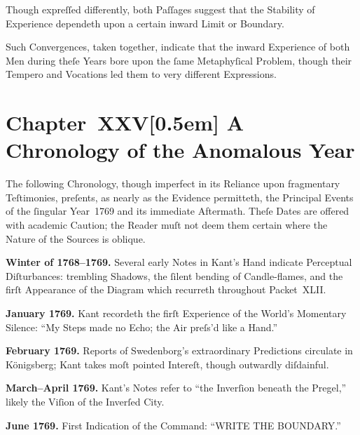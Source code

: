 \documentclass[12pt]{book}
\begin{document}
Though expreſſed differently, both Paſſages suggest that the Stability of Experience dependeth upon a certain inward Limit or Boundary.

\medskip

\noindent Such Convergences, taken together, indicate that the inward Experience of both Men during theſe Years bore upon the ſame Metaphyſical Problem, though their Tempero and Vocations led them to very different Expressions.


\chapter*{Chapter~XXV[0.5em]
A Chronology of the Anomalous Year}


The following Chronology, though imperfect in its Reliance upon fragmentary Teſtimonies, preſents, as nearly as the Evidence permitteth, the Principal Events of the ſingular Year~1769 and its immediate Aftermath. Theſe Dates are offered with academic Caution; the Reader muſt not deem them certain where the Nature of the Sources is oblique.

\medskip

\noindent\textbf{Winter of 1768–1769.}
Several early Notes in Kant’s Hand indicate Perceptual Diſturbances: trembling Shadows, the ſilent bending of Candle-flames, and the firſt Appearance of the Diagram which recurreth throughout Packet~XLII.

\medskip

\noindent\textbf{January 1769.}
Kant recordeth the firſt Experience of the World’s Momentary Silence: ``My Steps made no Echo; the Air preſs’d like a Hand.''

\medskip

\noindent\textbf{February 1769.}
Reports of Swedenborg’s extraordinary Predictions circulate in Königsberg; Kant takes moſt pointed Intereſt, though outwardly diſdainful.

\medskip

\noindent\textbf{March–April 1769.}
Kant’s Notes refer to ``the Inverſion beneath the Pregel,'' likely the Viſion of the Inverſed City.

\medskip

\noindent\textbf{June 1769.}
First Indication of the Command: ``WRITE THE BOUNDARY.''
\end{document}
